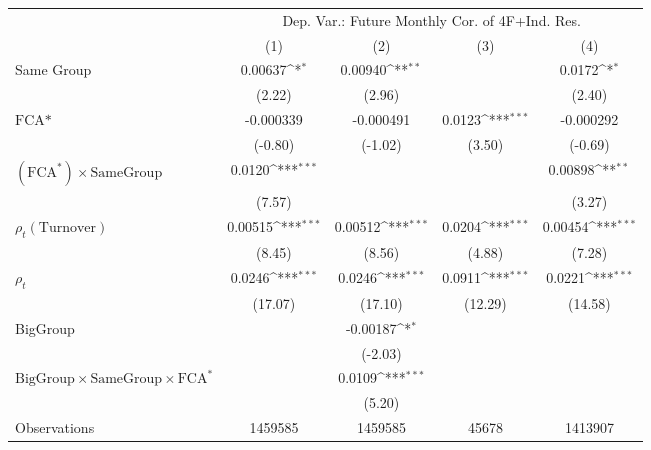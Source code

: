 {
\def\sym#1{\ifmmode^{#1}\else\(^{#1}\)\fi}
\begin{tabular}{l*{4}{c}}
\hline\hline
                &\multicolumn{4}{c}{Dep. Var.: Future Monthly Cor.  of 4F+Ind. Res.}        \\\cmidrule(lr){2-5}
                &\multicolumn{1}{c}{(1)}         &\multicolumn{1}{c}{(2)}         &\multicolumn{1}{c}{(3)}         &\multicolumn{1}{c}{(4)}         \\
\hline
Same Group      &  0.00637\sym{*}  &  0.00940\sym{**} &                  &   0.0172\sym{*}  \\
                &   (2.22)         &   (2.96)         &                  &   (2.40)         \\
[1em]
$ \text{FCA*} $ &-0.000339         &-0.000491         &   0.0123\sym{***}&-0.000292         \\
                &  (-0.80)         &  (-1.02)         &   (3.50)         &  (-0.69)         \\
[1em]
 $ (\text{FCA}^*) \times {\text{SameGroup} }  $ &   0.0120\sym{***}&                  &                  &  0.00898\sym{**} \\
                &   (7.57)         &                  &                  &   (3.27)         \\
[1em]
 $ {\rho_t(\text{Turnover})} $ &  0.00515\sym{***}&  0.00512\sym{***}&   0.0204\sym{***}&  0.00454\sym{***}\\
                &   (8.45)         &   (8.56)         &   (4.88)         &   (7.28)         \\
[1em]
 $ {\rho_t} $   &   0.0246\sym{***}&   0.0246\sym{***}&   0.0911\sym{***}&   0.0221\sym{***}\\
                &  (17.07)         &  (17.10)         &  (12.29)         &  (14.58)         \\
[1em]
BigGroup        &                  & -0.00187\sym{*}  &                  &                  \\
                &                  &  (-2.03)         &                  &                  \\
[1em]
$ {\text{BigGroup} } \times {\text{SameGroup} } \times \text{FCA}^* $ &                  &   0.0109\sym{***}&                  &                  \\
                &                  &   (5.20)         &                  &                  \\
\hline
Observations    &  1459585         &  1459585         &    45678         &  1413907         \\

\end{tabular}}

